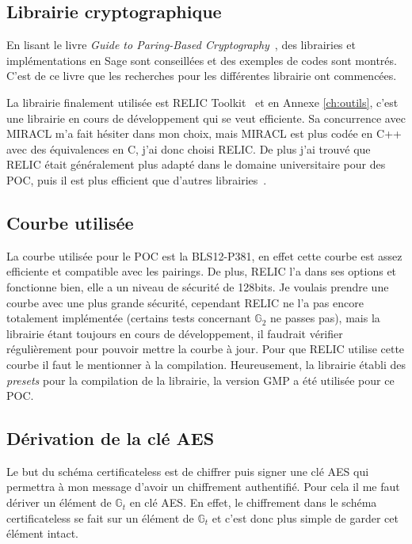 \subsection{Librairie cryptographique}
En lisant le livre \textit{Guide to Paring-Based Cryptography}~\cite{bookPairing}, des librairies et implémentations en Sage sont conseillées et des exemples de codes sont montrés. C'est de ce livre que les recherches pour les différentes librairie ont commencées.

La librairie finalement utilisée est RELIC Toolkit~\cite{relic-toolkit} et en Annexe \ref{ch:outils}, c'est une librairie en cours de développement qui se veut efficiente. Sa concurrence avec MIRACL m'a fait hésiter dans mon choix, mais MIRACL est plus codée en C++ avec des équivalences en C, j'ai donc choisi RELIC. De plus j'ai trouvé que RELIC était généralement plus adapté dans le domaine universitaire pour des POC, puis il est plus efficient que d'autres librairies~\cite{performanceRELIC}.

\subsection{Courbe utilisée}
La courbe utilisée pour le POC est la BLS12-P381, en effet cette courbe est assez efficiente et compatible avec les pairings. De plus, RELIC l'a dans ses options et fonctionne bien, elle a un niveau de sécurité de 128bits. Je voulais prendre une courbe avec une plus grande sécurité, cependant RELIC ne l'a pas encore totalement implémentée (certains tests concernant $\mathbb{G}_2$ ne passes pas), mais la librairie étant toujours en cours de développement, il faudrait vérifier régulièrement pour pouvoir mettre la courbe à jour. Pour que RELIC utilise cette courbe il faut le mentionner à la compilation. Heureusement, la librairie établi des \textit{presets} pour la compilation de la librairie, la version GMP a été utilisée pour ce POC.

\subsection{Dérivation de la clé AES}
Le but du schéma certificateless est de chiffrer puis signer une clé AES qui permettra à mon message d'avoir un chiffrement authentifié. Pour cela il me faut dériver un élément de $\mathbb{G}_t$ en clé AES. En effet, le chiffrement dans le schéma certificateless se fait sur un élément de $\mathbb{G}_t$ et c'est donc plus simple de garder cet élément intact.

